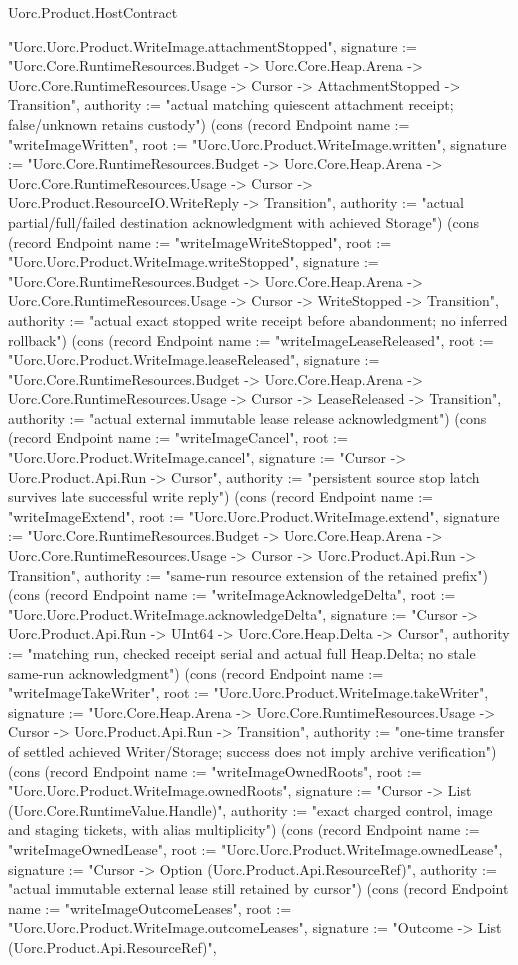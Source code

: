 \begin{lexlean}{Uorc.Product.HostContract}
\begin{semanticmodule}
{"Uorc.Uorc.Product.WriteImage.attachmentStopped", signature := "Uorc.Core.RuntimeResources.Budget -> Uorc.Core.Heap.Arena -> Uorc.Core.RuntimeResources.Usage -> Cursor -> AttachmentStopped -> Transition", authority := "actual matching quiescent attachment receipt; false/unknown retains custody"}) (cons (record Endpoint {name := "writeImageWritten", root := "Uorc.Uorc.Product.WriteImage.written", signature := "Uorc.Core.RuntimeResources.Budget -> Uorc.Core.Heap.Arena -> Uorc.Core.RuntimeResources.Usage -> Cursor -> Uorc.Product.ResourceIO.WriteReply -> Transition", authority := "actual partial/full/failed destination acknowledgment with achieved Storage"}) (cons (record Endpoint {name := "writeImageWriteStopped", root := "Uorc.Uorc.Product.WriteImage.writeStopped", signature := "Uorc.Core.RuntimeResources.Budget -> Uorc.Core.Heap.Arena -> Uorc.Core.RuntimeResources.Usage -> Cursor -> WriteStopped -> Transition", authority := "actual exact stopped write receipt before abandonment; no inferred rollback"}) (cons (record Endpoint {name := "writeImageLeaseReleased", root := "Uorc.Uorc.Product.WriteImage.leaseReleased", signature := "Uorc.Core.RuntimeResources.Budget -> Uorc.Core.Heap.Arena -> Uorc.Core.RuntimeResources.Usage -> Cursor -> LeaseReleased -> Transition", authority := "actual external immutable lease release acknowledgment"}) (cons (record Endpoint {name := "writeImageCancel", root := "Uorc.Uorc.Product.WriteImage.cancel", signature := "Cursor -> Uorc.Product.Api.Run -> Cursor", authority := "persistent source stop latch survives late successful write reply"}) (cons (record Endpoint {name := "writeImageExtend", root := "Uorc.Uorc.Product.WriteImage.extend", signature := "Uorc.Core.RuntimeResources.Budget -> Uorc.Core.Heap.Arena -> Uorc.Core.RuntimeResources.Usage -> Cursor -> Uorc.Product.Api.Run -> Transition", authority := "same-run resource extension of the retained prefix"}) (cons (record Endpoint {name := "writeImageAcknowledgeDelta", root := "Uorc.Uorc.Product.WriteImage.acknowledgeDelta", signature := "Cursor -> Uorc.Product.Api.Run -> UInt64 -> Uorc.Core.Heap.Delta -> Cursor", authority := "matching run, checked receipt serial and actual full Heap.Delta; no stale same-run acknowledgment"}) (cons (record Endpoint {name := "writeImageTakeWriter", root := "Uorc.Uorc.Product.WriteImage.takeWriter", signature := "Uorc.Core.Heap.Arena -> Uorc.Core.RuntimeResources.Usage -> Cursor -> Uorc.Product.Api.Run -> Transition", authority := "one-time transfer of settled achieved Writer/Storage; success does not imply archive verification"}) (cons (record Endpoint {name := "writeImageOwnedRoots", root := "Uorc.Uorc.Product.WriteImage.ownedRoots", signature := "Cursor -> List (Uorc.Core.RuntimeValue.Handle)", authority := "exact charged control, image and staging tickets, with alias multiplicity"}) (cons (record Endpoint {name := "writeImageOwnedLease", root := "Uorc.Uorc.Product.WriteImage.ownedLease", signature := "Cursor -> Option (Uorc.Product.Api.ResourceRef)", authority := "actual immutable external lease still retained by cursor"}) (cons (record Endpoint {name := "writeImageOutcomeLeases", root := "Uorc.Uorc.Product.WriteImage.outcomeLeases", signature := "Outcome -> List (Uorc.Product.Api.ResourceRef)", }
\end{semanticmodule}
\end{lexlean}
